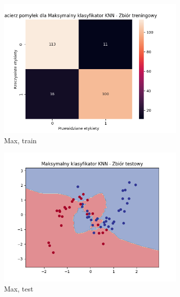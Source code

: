 \documentclass[12pt]{article}
\newcommand*{\subfigwidth}{0.15\textwidth}
\begin{document}
\begin{figure}[H]
\begin{subfigure}[t]{\subfigwidth}
        \includegraphics[width=\linewidth]{img/exp_2/knn/2_3/max/train_matrix.png}
        \caption{Max, train}
    \end{subfigure}
    \hfill
    \begin{subfigure}[t]{\subfigwidth}
        \includegraphics[width=\linewidth]{img/exp_2/knn/2_3/max/test_boundary.png}
        \caption{Max, test}
    \end{subfigure}
    \hfill
    \begin{subfigure}[t]{\subfigwidth}

\end{subfigure}
\end{figure}
\end{document}
